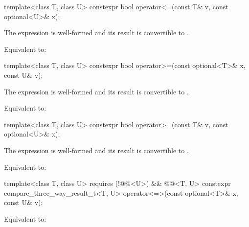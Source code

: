 %
\begin{itemdecl}
template<class T, class U> constexpr bool operator<=(const T& v, const optional<U>& x);
\end{itemdecl}

\begin{itemdescr}
\pnum
\constraints
The expression  is well-formed and
its result is convertible to .

\pnum
\effects
Equivalent to: 
\end{itemdescr}

%
\begin{itemdecl}
template<class T, class U> constexpr bool operator>=(const optional<T>& x, const U& v);
\end{itemdecl}

\begin{itemdescr}
\pnum
\constraints
The expression  is well-formed and
its result is convertible to .

\pnum
\effects
Equivalent to: 
\end{itemdescr}

%
\begin{itemdecl}
template<class T, class U> constexpr bool operator>=(const T& v, const optional<U>& x);
\end{itemdecl}

\begin{itemdescr}
\pnum
\constraints
The expression  is well-formed and
its result is convertible to .

\pnum
\effects
Equivalent to: 
\end{itemdescr}

%
\begin{itemdecl}
template<class T, class U>
    requires (!@@<U>) && @@<T, U>
  constexpr compare_three_way_result_t<T, U>
    operator<=>(const optional<T>& x, const U& v);
\end{itemdecl}

\begin{itemdescr}
\pnum
\effects
Equivalent to: 
\end{itemdescr}

